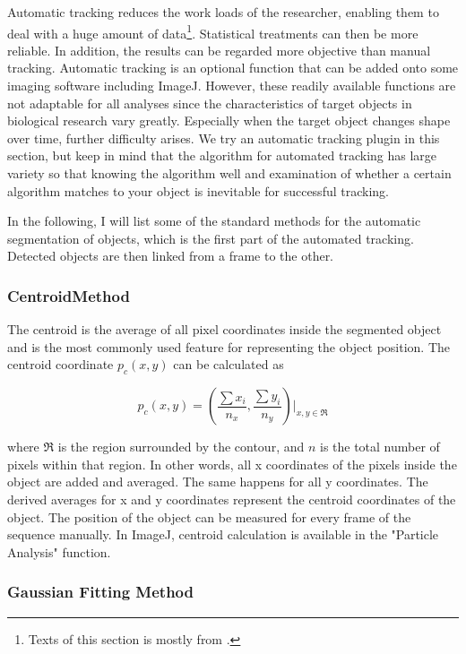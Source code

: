 Automatic tracking reduces the work loads of the researcher, enabling
them to deal with a huge amount of data\footnote{ Texts of this section is mostly from \citep{MiuraME2005}.}. Statistical treatments can
then be more reliable. In addition, the results can be regarded more
objective than manual tracking. Automatic tracking is an optional
function that can be added onto some imaging software including ImageJ. However,
these readily available functions are not adaptable for all analyses since
the characteristics of target objects in biological research vary
greatly. Especially when the target object changes shape over time,
further difficulty arises. We try an automatic tracking plugin in this section,
but keep in mind that the algorithm for automated tracking has large variety
so that knowing the algorithm well and examination of whether a certain
algorithm matches to your object is inevitable for successful tracking.

In the following, I will list some of the standard methods for the
automatic segmentation of objects, which is the first part of the automated
tracking. Detected objects are then linked from a frame to the other.

\subsubsection{CentroidMethod}
The centroid is the average of all pixel coordinates inside the
segmented object and is the most commonly used feature for representing
the object position. The centroid coordinate
$p_{c}(x,y)$ can be calculated as

\begin{equation}
p_{c}(x,y)=(\frac{\sum{x_{i}}}{n_{x}}, \frac{\sum{y_{i}}}{n_{y}})|_{x,y\in\mathfrak{R}}
\end{equation}

where $\mathfrak{R}$
is the region surrounded by the contour, and $n$ is the total
number of pixels within that region. In other words, all x coordinates
of the pixels inside the object are added and averaged. The same
happens for all y coordinates. The derived averages for x and y
coordinates represent the centroid coordinates of the object. The
position of the object can be measured for every frame of the sequence
manually. In ImageJ, centroid calculation is available in the
"Particle Analysis" function.

\subsubsection{Gaussian Fitting Method}

